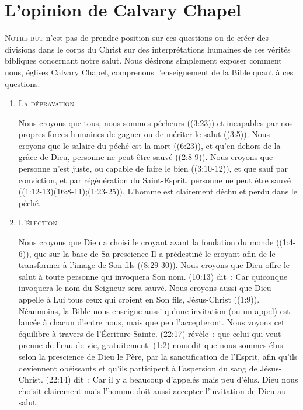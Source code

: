 \section{L'opinion de Calvary Chapel}

\lettrine{N}{otre but} n'est pas de prendre position sur ces questions
  ou de créer des divisions dans le corps du Christ
 sur des interprétations humaines de ces vérités bibliques
 concernant notre salut.
 Nous désirons simplement exposer comment nous,
 églises Calvary Chapel, comprenons l'enseignement de la Bible
 quant à ces questions.
 
\begin{enumerate}

  \item  \textsc{La dépravation}

Nous croyons que tous, nous sommes pécheurs ((3:23))
 et incapables par nos propres forces humaines de gagner ou
 de mériter le salut ((3:5)).
 Nous croyons que le salaire du péché est la mort ((6:23)),
 et qu'en dehors de la grâce de Dieu, personne ne peut être sauvé
 ((2:8-9)).
 Nous croyons que personne n'est juste, ou capable de faire le bien
 ((3:10-12)), et que sauf par conviction,
 et par régénération du Saint-Esprit, personne ne peut être sauvé
 ((1:12-13)(16:8-11);(1:23-25)).
 L'homme est clairement déchu et perdu dans le péché.


  \item  \textsc{L'élection}

Nous croyons que Dieu a choisi le croyant avant la fondation du monde
 ((1:4-6)), que sur la base de Sa prescience 
 Il a prédestiné le croyant afin de le transformer à l'image de Son fils
 ((8:29-30)).
 Nous croyons que Dieu offre le salut à toute personne qui invoquera Son nom.
 (10:13) dit~: \og Car quiconque invoquera le nom du Seigneur sera sauvé. \fg{}
 Nous croyons aussi que Dieu appelle à Lui tous ceux qui croient en Son fils,
 Jésus-Christ ((1:9)).
Néanmoins, la Bible nous enseigne aussi qu'une invitation (ou un appel)
 est lancée à chacun d'entre nous, mais que peu l'accepteront.
 Nous voyons cet équilibre à travers de l'Écriture Sainte.
 (22:17) révèle~:
 \og [\dots{}] que  celui qui veut prenne de l'eau de vie, gratuitement. \fg{}
 (1:2) nous dit que nous sommes \og élus selon la prescience de Dieu le Père,
 par la sanctification de l'Esprit, afin qu'ils deviennent obéissants et qu'ils participent
 à l'aspersion du sang de Jésus-Christ. \fg{}
 (22:14) dit~: \og Car il y a beaucoup d'appelés mais peu d'élus. \fg{}
 Dieu nous choisit clairement mais l'homme doit aussi accepter l'invitation de Dieu au salut.



\end{enumerate}
